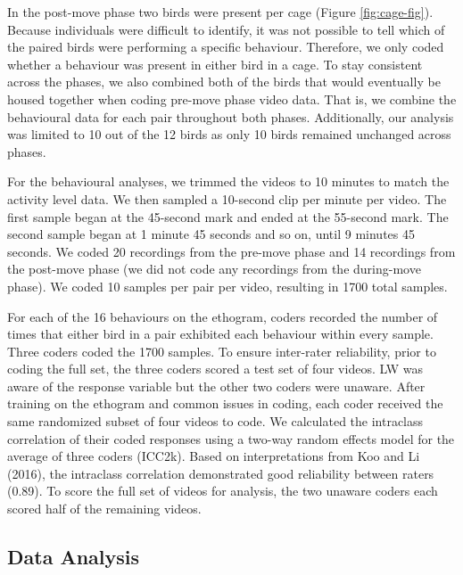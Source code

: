 \documentclass[
  pub]{apa6}
\begin{document}
In the post-move phase two birds were present per cage (Figure \ref{fig:cage-fig}). Because individuals were difficult to identify, it was not possible to tell which of the paired birds were performing a specific behaviour. Therefore, we only coded whether a behaviour was present in either bird in a cage. To stay consistent across the phases, we also combined both of the birds that would eventually be housed together when coding pre-move phase video data. That is, we combine the behavioural data for each pair throughout both phases. Additionally, our analysis was limited to 10 out of the 12 birds as only 10 birds remained unchanged across phases.

For the behavioural analyses, we trimmed the videos to 10 minutes to match the activity level data. We then sampled a 10-second clip per minute per video. The first sample began at the 45-second mark and ended at the 55-second mark. The second sample began at 1 minute 45 seconds and so on, until 9 minutes 45 seconds. We coded 20 recordings from the pre-move phase and 14 recordings from the post-move phase (we did not code any recordings from the during-move phase). We coded 10 samples per pair per video, resulting in 1700 total samples.

For each of the 16 behaviours on the ethogram, coders recorded the number of times that either bird in a pair exhibited each behaviour within every sample. Three coders coded the 1700 samples. To ensure inter-rater reliability, prior to coding the full set, the three coders scored a test set of four videos. LW was aware of the response variable but the other two coders were unaware. After training on the ethogram and common issues in coding, each coder received the same randomized subset of four videos to code. We calculated the intraclass correlation of their coded responses using a two-way random effects model for the average of three coders (ICC2k). Based on interpretations from Koo and Li (2016), the intraclass correlation demonstrated good reliability between raters (0.89). To score the full set of videos for analysis, the two unaware coders each scored half of the remaining videos.

\subsection{Data Analysis}\label{data-analysis}
\end{document}
